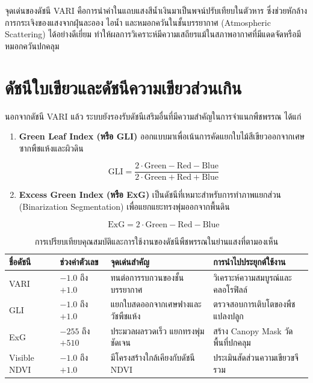จุดเด่นของดัชนี VARI คือการนำค่าในแถบแสงสีน้ำเงินมาเป็นพจน์ปรับเทียบในตัวหาร ซึ่งช่วยหักล้างการกระเจิงของแสงจากฝุ่นละออง ไอน้ำ และหมอกควันในชั้นบรรยากาศ (Atmospheric Scattering) ได้อย่างดีเยี่ยม ทำให้ผลการวิเคราะห์มีความเสถียรแม้ในสภาพอากาศที่มีแดดจัดหรือมีหมอกควันปกคลุม

\section{ดัชนีใบเขียวและดัชนีความเขียวส่วนเกิน}

นอกจากดัชนี VARI แล้ว ระบบยังรองรับดัชนีเสริมอื่นที่มีความสำคัญในการจำแนกพืชพรรณ ได้แก่

\begin{enumerate}
    \item \textbf{Green Leaf Index (หรือ GLI)} ออกแบบมาเพื่อเน้นการคัดแยกใบไม้สีเขียวออกจากเศษซากพืชแห้งและผิวดิน
    \begin{formulabox}
    \begin{equation}
    \text{GLI} = \frac{2\cdot\text{Green} - \text{Red} - \text{Blue}}{2\cdot\text{Green} + \text{Red} + \text{Blue}}
    \label{eq:gli}
    \end{equation}
    \end{formulabox}

    \item \textbf{Excess Green Index (หรือ ExG)} เป็นดัชนีที่เหมาะสำหรับการทำภาพแยกส่วน (Binarization Segmentation) เพื่อแยกแยะทรงพุ่มออกจากพื้นดิน
    \begin{formulabox}
    \begin{equation}
    \text{ExG} = 2\cdot\text{Green} - \text{Red} - \text{Blue}
    \label{eq:exg}
    \end{equation}
    \end{formulabox}
\end{enumerate}

\begin{table}[H]
\caption{การเปรียบเทียบคุณสมบัติและการใช้งานของดัชนีพืชพรรณในย่านแสงที่ตามองเห็น}
\label{tab:indices_comparison}
\begin{tabularx}{\textwidth}{p{2.8cm}p{3.8cm}p{3.5cm}Y}
\toprule
\textbf{ชื่อดัชนี} & \textbf{ช่วงค่าตัวเลข} & \textbf{จุดเด่นสำคัญ} & \textbf{การนำไปประยุกต์ใช้งาน} \\
\midrule
VARI & $-1.0$ ถึง $+1.0$ & ทนต่อการรบกวนของชั้นบรรยากาศ & วิเคราะห์ความสมบูรณ์และคลอโรฟิลล์ \\
GLI & $-1.0$ ถึง $+1.0$ & แยกใบสดออกจากเศษฟางและวัชพืชแห้ง & ตรวจสอบการเติบโตของพืชแปลงปลูก \\
ExG & $-255$ ถึง $+510$ & ประมวลผลรวดเร็ว แยกทรงพุ่มชัดเจน & สร้าง Canopy Mask วัดพื้นที่ปกคลุม \\
Visible NDVI & $-1.0$ ถึง $+1.0$ & มีโครงสร้างใกล้เคียงกับดัชนี NDVI & ประเมินสัดส่วนความเขียวขจีรวม \\
\bottomrule
\end{tabularx}
\end{table}

